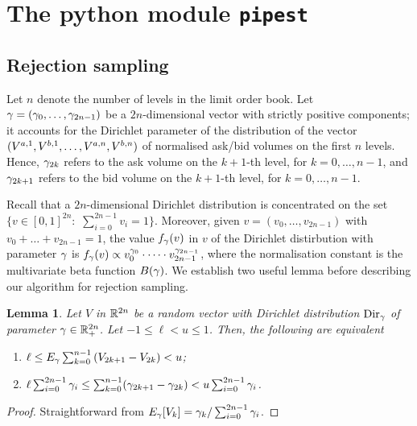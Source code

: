 \documentclass[10pt]{article}
\newtheorem{lemma}[thm]{Lemma}
\begin{document}
\newpage 

\section{The python module \texttt{pipest}}\label{sec.the_python_module}

\subsection{Rejection sampling}\label{sec.pipest.rejection_sampling}
Let $n$ denote the number of levels in the limit order book. Let $\dirparam=(\dirparam_{0},\dots,\dirparam_{2n-1})$ be a $2n$-dimensional vector with strictly positive components; it accounts for the Dirichlet parameter of the distribution of the vector $(\nthBestAskVolume[1],\nthBestBidVolume[1],\dots, \nthBestAskVolume[n],\nthBestBidVolume[n])$ of normalised ask/bid volumes on the first $n$ levels. Hence, $\dirparam_{2k}$ refers to the ask volume on the $k+1$-th level, for $k=0,\dots,n-1$, and 
$\dirparam_{2k+1}$ refers to the bid volume on the $k+1$-th level, for $k=0,\dots,n-1$. 

Recall that a $2n$-dimensional Dirichlet distribution is concentrated on the set $\lbrace v \in [0,1]^{2n}: \, \, \sum_{i=0}^{2n-1} v_i = 1 \rbrace$. Moreover, given $v=(v_0, \dots,v_{2n-1})$ with  $v_0 + \dots + v_{2n-1} = 1$, the value $\dirichletDensity(v)$ in $v$  of the Dirichlet distirbution with parameter $\dirparam$ is $\dirichletDensity(v) \propto v_{0}^{\dirparam_{0}} \cdot \dots \cdot v_{2n-1}^{\dirparam_{2n-1}}$, where  the normalisation constant is the multivariate beta function $B(\dirparam)$.
We establish two useful lemma before describing our algorithm for rejection sampling. 

\begin{lemma}\label{lemma.equivalence_expected_constraint}
 Let $V$ in $\R^{2n}$ be a random vector with Dirichlet distribution $\text{Dir}_{\dirparam}$ of parameter $\dirparam \in \R^{2n}_{+}$. Let  $-1\leq \ell < u \leq 1$. Then, the following are equivalent 
 \begin{enumerate}[label={\roman{*}.} , ref={\ref{lemma.equivalence_expected_constraint}.\roman{*}}]
  \item \label{lemma.equivalence_expected_constraint.expectation}$
  \ell \leq \Expectation_{\dirparam} \sum_{k=0}^{n-1} \left( V_{2k+1} - V_{2k} \right) < u $;
  \item \label{lemma.equivalence_expected_constraint.parameter} $\ell \sum_{i=0}^{2n-1}\dirparam_i 
  \leq 
  \sum_{k=0}^{n-1} (\dirparam_{2k+1} - \dirparam_{2k} ) 
  < u \sum_{i=0}^{2n-1}\dirparam_i
  $.
 \end{enumerate}
\end{lemma}
\begin{proof}
 Straightforward from $\Expectation_{\dirparam}[V_{k}] = \dirparam_{k}/\sum_{i=0}^{2n-1} \dirparam_{i}$.
\end{proof}
\end{document}
